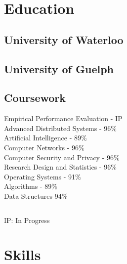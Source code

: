 \documentclass[]{chowes-resume}
\begin{document}
\begin{minipage}[t]{0.33\textwidth}



\section{Education} 

\subsection{University of Waterloo}
\sectionsep

\subsection{University of Guelph}
\sectionsep

\subsection{Coursework}
Empirical Performance Evaluation - IP\\
Advanced Distributed Systems - 96\%\\
Artificial Intelligence - 89\%\\
Computer Networks - 96\%\\
Computer Security and Privacy - 96\%\\
Research Design and Statistics - 96\%\\
Operating Systems - 91\%\\
Algorithms - 89\%\\
Data Structures 94\%\\

\subsection{}
IP: In Progress
\sectionsep



\section{Skills}


\end{minipage}
\end{document}
